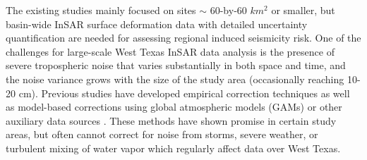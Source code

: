 The existing studies mainly focused on sites $ \sim $ 60-by-60 $km^2$ or smaller, but basin-wide InSAR surface deformation data with detailed uncertainty quantification are needed for assessing regional induced seismicity risk. One of the challenges for large-scale West Texas InSAR data analysis is the presence of severe tropospheric noise that varies substantially in both space and time, and the noise variance grows with the size of the study area (occasionally reaching 10-20 cm).
Previous studies have developed empirical correction techniques \citep{Lauknes2011InsarTroposphericStratification, Bekaert2015SpatiallyVariablePower} as well as model-based corrections using global atmospheric models (GAMs) \citep{Doin2009CorrectionsStratifiedTropospheric} or other auxiliary data sources \citep{Li2005InterferometricSyntheticAperture,Ding2008AtmosphericEffectsInsar}.
These methods have shown promise in certain study areas, but often cannot correct for noise from storms, severe weather, or turbulent mixing of water vapor which regularly affect data over West Texas.


